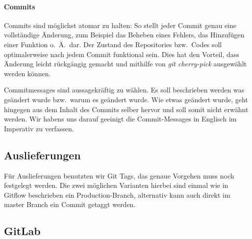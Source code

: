 \paragraph{Commits}
Commits sind möglichst atomar zu halten:
So stellt jeder Commit genau eine vollständige Änderung, zum Beispiel das Beheben eines
Fehlers, das Hinzufügen einer Funktion o.\ Ä.\ dar.
Der Zustand des Repositories bzw.\ Codes soll optimalerweise nach jedem Commit funktional sein.
Dies hat den Vorteil, dass Änderung leicht rückgängig gemacht und mithilfe von
\textit{git cherry-pick} ausgewählt werden können.

Commitmessages sind aussagekräftig zu wählen.
Es soll beschrieben werden was geändert wurde bzw.\ warum es geändert wurde.
Wie etwas geändert wurde, geht hingegen aus dem Inhalt des Commits selber hervor und soll somit
nicht erwähnt werden.
Wir habens uns darauf geeinigt die Commit-Messages in Englisch im Imperativ zu verfassen.

\subsection{Auslieferungen}\label{subsec:auslieferungen}
Für Auslieferungen benutzten wir Git Tags, das genaue Vorgehen muss noch festgelegt werden.
Die zwei möglichen Varianten hierbei sind einmal wie in Gitflow beschrieben ein
Production-Branch, alternativ kann auch direkt im master Branch ein Commit getaggt werden.

\subsection{GitLab}\label{subsec:gitlab}



